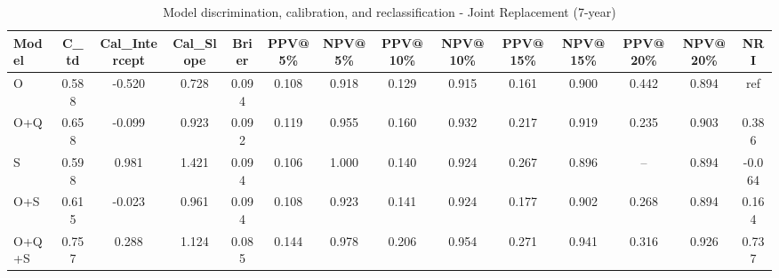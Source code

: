 \begin{table}[htbp]
\centering
\small
\caption{Model discrimination, calibration, and reclassification - Joint Replacement (7-year)}
\label{tab:perf_joint_7y}
\begin{tabular}{lccccccccccccc}
\toprule
Model & C\_td & Cal\_Intercept & Cal\_Slope & Brier & PPV@5\% & NPV@5\% & PPV@10\% & NPV@10\% & PPV@15\% & NPV@15\% & PPV@20\% & NPV@20\% & NRI \\
\midrule
O & 0.588 & -0.520 & 0.728 & 0.094 & 0.108 & 0.918 & 0.129 & 0.915 & 0.161 & 0.900 & 0.442 & 0.894 & ref \\
O+Q & 0.658 & -0.099 & 0.923 & 0.092 & 0.119 & 0.955 & 0.160 & 0.932 & 0.217 & 0.919 & 0.235 & 0.903 & 0.386 \\
S & 0.598 & 0.981 & 1.421 & 0.094 & 0.106 & 1.000 & 0.140 & 0.924 & 0.267 & 0.896 & -- & 0.894 & -0.064 \\
O+S & 0.615 & -0.023 & 0.961 & 0.094 & 0.108 & 0.923 & 0.141 & 0.924 & 0.177 & 0.902 & 0.268 & 0.894 & 0.164 \\
O+Q+S & 0.757 & 0.288 & 1.124 & 0.085 & 0.144 & 0.978 & 0.206 & 0.954 & 0.271 & 0.941 & 0.316 & 0.926 & 0.737 \\
\bottomrule
\end{tabular}
\end{table}